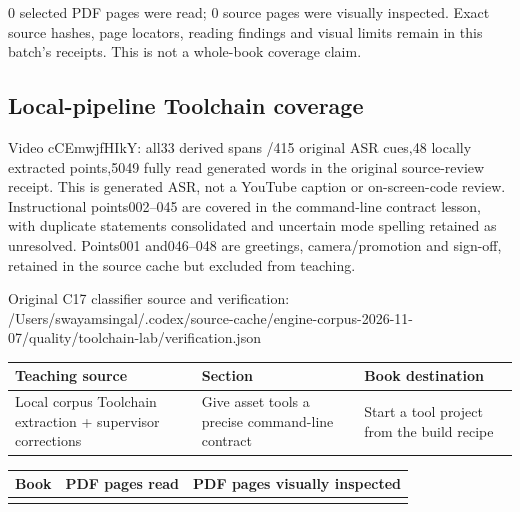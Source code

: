 0 selected PDF pages were read; 0 source pages were visually inspected. Exact source hashes, page locators, reading findings and visual limits remain in this batch's receipts. This is not a whole-book coverage claim.

\subsection{Local-pipeline Toolchain coverage}\label{local-pipeline-toolchain-coverage}

Video cCEmwjfHIkY: all33 derived spans /415 original ASR cues,48 locally extracted points,5049 fully read generated words in the original source-review receipt. This is generated ASR, not a YouTube caption or on-screen-code review. Instructional points002--045 are covered in the command-line contract lesson, with duplicate statements consolidated and uncertain mode spelling retained as unresolved. Points001 and046--048 are greetings, camera/promotion and sign-off, retained in the source cache but excluded from teaching.

Original C17 classifier source and verification: /Users/swayamsingal/.codex/source-cache/engine-corpus-2026-11-07/quality/toolchain-lab/verification.json

{\def\LTcaptype{none} %
\begin{longtable}[]{@{}
  >{\raggedright\arraybackslash}p{}
  >{\raggedright\arraybackslash}p{}
  >{\raggedright\arraybackslash}p{}@{}}
\toprule\noalign{}
\begin{minipage}[b]{\linewidth}\raggedright
Teaching source
\end{minipage} & \begin{minipage}[b]{\linewidth}\raggedright
Section
\end{minipage} & \begin{minipage}[b]{\linewidth}\raggedright
Book destination
\end{minipage} \\
\midrule\noalign{}
\endhead
\bottomrule\noalign{}
\endlastfoot
Local corpus Toolchain extraction + supervisor corrections & Give asset tools a precise command-line contract & Start a tool project from the build recipe \\
\end{longtable}
}

{\def\LTcaptype{none} %
\begin{longtable}[]{@{}lll@{}}
\toprule\noalign{}
Book & PDF pages read & PDF pages visually inspected \\
\midrule\noalign{}
\endhead
\bottomrule\noalign{}
\endlastfoot
\end{longtable}
}

